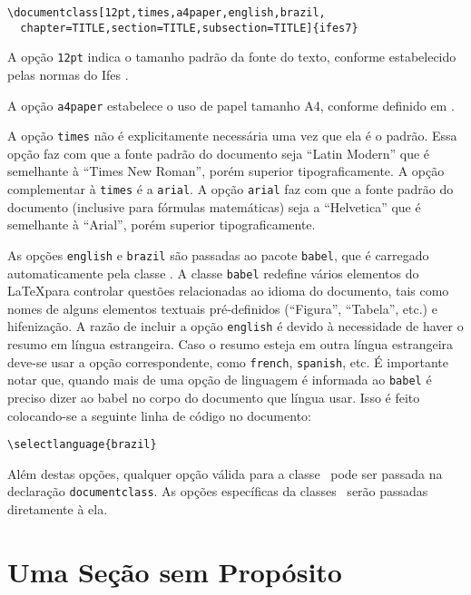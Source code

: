 \documentclass[12pt,times,a4paper,english,brazil,
chapter=TITLE,section=TITLE,subsection=TITLE]{ifes7}
\begin{document}
\begin{lstlisting}[language={[LaTeX]TeX}]
  \documentclass[12pt,times,a4paper,english,brazil,
  chapter=TITLE,section=TITLE,subsection=TITLE]{ifes7}  
\end{lstlisting}

A opção \texttt{12pt} indica o tamanho padrão da fonte do texto,
conforme estabelecido pelas normas do Ifes \cite[pp.~20]{Ifes2014}.

A opção \texttt{a4paper} estabelece o uso de papel tamanho A4,
conforme definido em \cite[pp.~19]{Ifes2014}.

A opção \texttt{times} não é explicitamente necessária uma vez que ela
é o padrão. Essa opção faz com que a fonte padrão do documento seja
“Latin Modern” que é semelhante à “Times New Roman”, porém superior
tipograficamente. A opção complementar à \texttt{times} é a
\texttt{arial}. A opção \texttt{arial} faz com que a fonte padrão do
documento (inclusive para fórmulas matemáticas) seja a “Helvetica” que
é semelhante à “Arial”, porém superior tipograficamente.

As opções \texttt{english} e \texttt{brazil} são passadas ao pacote
\texttt{babel}, que é carregado automaticamente pela classe \abnTeX.
A classe \texttt{babel} redefine vários elementos do \LaTeX para
controlar questões relacionadas ao idioma do documento, tais como
nomes de alguns elementos textuais pré-definidos (``Figura'',
``Tabela'', etc.) e hifenização. A razão de incluir a opção
\texttt{english} é devido à necessidade de haver o resumo em língua
estrangeira. Caso o resumo esteja em outra língua estrangeira deve-se
usar a opção correspondente, como \texttt{french}, \texttt{spanish},
etc. É importante notar que, quando mais de uma opção de linguagem é
informada ao \texttt{babel} é preciso dizer ao babel no corpo do
documento que língua usar. Isso é feito colocando-se a seguinte linha
de código no documento:

\begin{lstlisting}[language={[LaTeX]TeX}]
  \selectlanguage{brazil}  
\end{lstlisting}

Além destas opções, qualquer opção válida para a classe \abnTeX\ pode
ser passada na declaração \texttt{documentclass}. As opções
específicas da classes \abnTeX\ serão passadas diretamente à ela.


\section{Uma Seção sem Propósito}
\label{sec:sem-proposito1}
\end{document}
